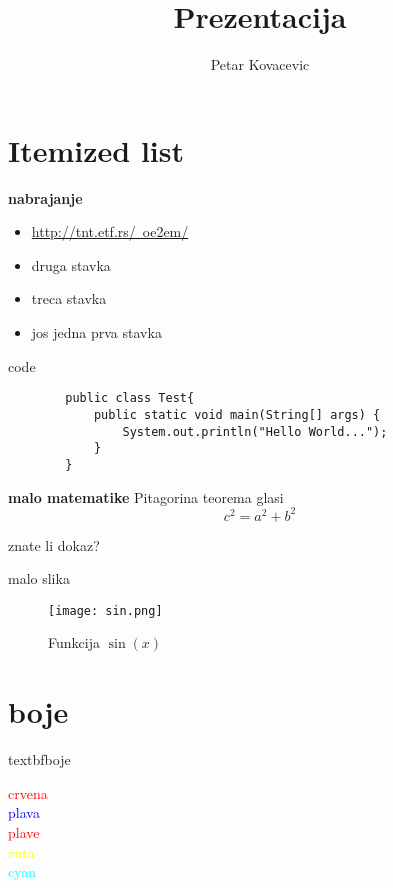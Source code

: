 \documentclass{beamer}
\title[prezentacija]{\Huge{Prezentacija}} %
\author{Petar Kovacevic}
\begin{document}
\begin{frame}
	\titlepage

\end{frame}


\section{Itemized list}

\begin{frame}{\textbf{nabrajanje}}
	\begin{itemize}
		\item  \href{http://tnt.etf.rs/~oe2em/}{http://tnt.etf.rs/~oe2em/}
		\item  druga stavka
		\item  treca stavka
		\item  jos jedna prva stavka

	\end{itemize}
\end{frame}


\begin{frame}[fragile]{code}
	\begin{verbatim}	
		public class Test{
			public static void main(String[] args) {
				System.out.println("Hello World...");
			}
		}
	\end{verbatim}
\end{frame}


\begin{frame}{\textbf{malo matematike}}
	Pitagorina teorema glasi
	\pause
	\bigskip
	\begin{equation}	
		c^2 = a^2 + b^2
	\end{equation}
	\pause

	znate li dokaz?
\end{frame}


\begin{frame}{malo slika}
	\begin{figure}
		\centering
		\texttt{[image: sin.png]}
		\caption{Funkcija $\sin \left( x \right)$}
		\label{slika:sinus}
	\end{figure}
\end{frame}


\section{boje}

\begin{frame}{textbf{boje}}
	\begin{Large}
	\textcolor{red}{crvena}\\
	\textcolor{blue}{plava}\\
	\textcolor{red}{plave}\\
	\textcolor{yellow}{zuta}\\
	\textcolor{cyan}{cyan}\\
	\end{Large}
\end{frame}
\end{document}
